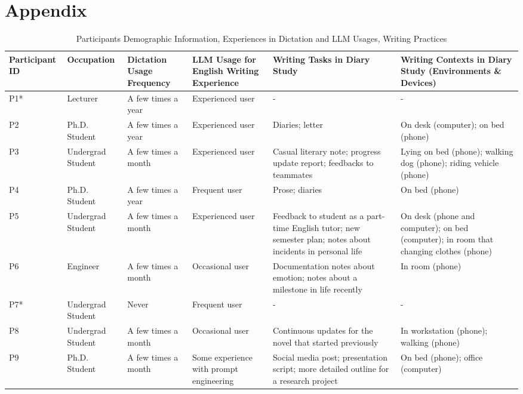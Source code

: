 \section{Appendix}
\begin{table*}[ht!]
    \caption{Participants Demographic Information, Experiences in Dictation and LLM Usages, Writing Practices}
    \label{tab:users}
    \centering
    \small
    \renewcommand{\arraystretch}{1.2}
    \begin{tabular}{|p{1.8cm}|p{2.3cm}|p{1.8cm}|p{2cm}|p{4cm}|p{3.5cm}|}
        \hline
        \textbf{Participant ID} & \textbf{Occupation} & \textbf{Dictation Usage Frequency} & \textbf{LLM Usage for English Writing Experience} & \textbf{Writing Tasks in Diary Study} & \textbf{Writing Contexts in Diary Study (Environments \& Devices)} \\ \hline
        P1* & Lecturer & A few times a year & Experienced user & - & - \\ \hline
        P2 & Ph.D. Student & A few times a year & Experienced user & Diaries; letter & On desk (computer); on bed (phone) \\ \hline
        P3 & Undergrad Student & A few times a month & Experienced user & Casual literary note; progress update report; feedbacks to teammates & Lying on bed (phone); walking dog (phone); riding vehicle (phone) \\ \hline
        P4 & Ph.D. Student & A few times a year & Frequent user & Prose; diaries & On bed (phone) \\ \hline
        P5 & Undergrad Student & A few times a month & Experienced user & Feedback to student as a part-time English tutor; new semester plan; notes about incidents in personal life & On desk (phone and computer); on bed (computer); in room that changing clothes (phone) \\ \hline
        P6 & Engineer & A few times a month & Occasional user & Documentation notes about emotion; notes about a milestone in life recently & In room (phone) \\ \hline
        P7* & Undergrad Student & Never & Frequent user & - & - \\ \hline
        P8 & Undergrad Student & A few times a month & Occasional user & Continuous updates for the novel that started previously & In workstation (phone); walking (phone) \\ \hline
        P9 & Ph.D. Student & A few times a month & Some experience with prompt engineering & Social media post; presentation script; more detailed outline for a research project & On bed (phone); office (computer) \\ \hline

\end{tabular}
\end{table*}

